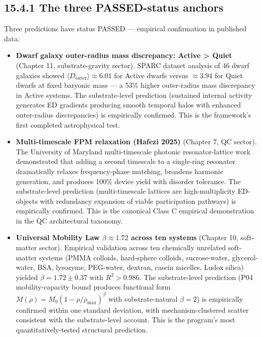 \documentclass[11pt]{book}
\begin{document}
\subsection{15.4.1 The three PASSED-status anchors}

Three predictions have status PASSED — empirical confirmation in published data:

\begin{itemize}
\item \textbf{Dwarf galaxy outer-radius mass discrepancy: Active > Quiet} (Chapter 11, substrate-gravity sector). SPARC dataset analysis of 46 dwarf galaxies showed $\langle D_\mathrm{outer}\rangle \approx 6.01$ for Active dwarfs versus $\approx 3.94$ for Quiet dwarfs at fixed baryonic mass — a 53\% higher outer-radius mass discrepancy in Active systems. The substrate-level prediction (sustained internal activity generates ED gradients producing smooth temporal halos with enhanced outer-radius discrepancies) is empirically confirmed. This is the framework's first completed astrophysical test.
\item \textbf{Multi-timescale FPM relaxation (Hafezi 2025)} (Chapter 7, QC sector). The University of Maryland multi-timescale photonic resonator-lattice work demonstrated that adding a second timescale to a single-ring resonator dramatically relaxes frequency-phase matching, broadens harmonic generation, and produces 100\% device yield with disorder tolerance. The substrate-level prediction (multi-timescale lattices are high-multiplicity ED-objects with redundancy expansion of viable participation pathways) is empirically confirmed. This is the canonical Class C empirical demonstration in the QC architectural taxonomy.
\item \textbf{Universal Mobility Law $\beta \approx 1.72$ across ten systems} (Chapter 10, soft-matter sector). Empirical validation across ten chemically unrelated soft-matter systems (PMMA colloids, hard-sphere colloids, sucrose-water, glycerol-water, BSA, lysozyme, PEG-water, dextran, casein micelles, Ludox silica) yielded $\beta = 1.72 \pm 0.37$ with $R^2 > 0.986$. The substrate-level prediction (P04 mobility-capacity bound produces functional form $M(\rho) = M_0(1-\rho/\rho_\mathrm{max})^\beta$ with substrate-natural $\beta = 2$) is empirically confirmed within one standard deviation, with mechanism-clustered scatter consistent with the substrate-level account. This is the program's most quantitatively-tested structural prediction.
\end{itemize}
\end{document}
